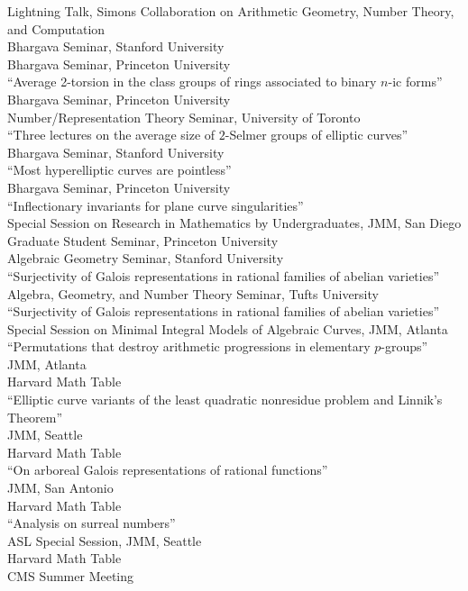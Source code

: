 \documentclass[11pt]{article} %
\begin{document}
Lightning Talk, Simons Collaboration on Arithmetic Geometry, Number Theory, and Computation \\
Bhargava Seminar, Stanford University \\
Bhargava Seminar, Princeton University \\
 ``Average 2-torsion in the class groups of rings associated to binary 
$n$-ic forms'' \\
Bhargava Seminar, Princeton University \\
Number/Representation Theory Seminar, University of Toronto \\
 ``Three lectures on the average size of $2$-Selmer groups of elliptic curves'' \\
Bhargava Seminar, Stanford University \\
 ``Most hyperelliptic curves are pointless'' \\
Bhargava Seminar, Princeton University \\
 ``Inflectionary invariants for plane curve singularities'' \\
Special Session on Research in Mathematics by Undergraduates, JMM, San Diego \\
Graduate Student Seminar, Princeton University \\
Algebraic Geometry Seminar, Stanford University \\
 ``Surjectivity of Galois representations in rational families of abelian varieties'' \\
Algebra, Geometry, and Number Theory Seminar, Tufts University \\
 ``Surjectivity of Galois representations in rational families of abelian varieties'' \\
Special Session on Minimal Integral Models of Algebraic Curves, JMM, Atlanta \\
 ``Permutations that destroy arithmetic progressions in elementary 
$p$-groups'' \\
JMM, Atlanta \\
Harvard Math Table \\
 ``Elliptic curve variants of the least quadratic nonresidue problem and Linnik's Theorem'' \\
JMM, Seattle \\
Harvard Math Table \\
 ``On arboreal Galois representations of rational functions'' \\
JMM, San Antonio \\
Harvard Math Table \\
 ``Analysis on surreal numbers'' \\
ASL Special Session, JMM, Seattle \\
Harvard Math Table \\
CMS Summer Meeting \\
\end{document}
